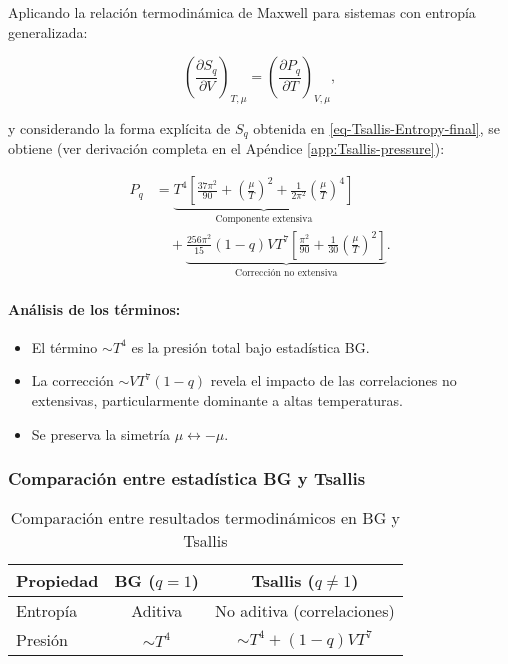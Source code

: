 Aplicando la relación termodinámica de Maxwell para sistemas con entropía generalizada:

\begin{equation}\label{eq-Maxwell-Tsallis}
\left( \frac{\partial S_q}{\partial V} \right)_{T, \mu} = \left( \frac{\partial P_q}{\partial T} \right)_{V, \mu},
\end{equation}

y considerando la forma explícita de \( S_q \) obtenida en \eqref{eq-Tsallis-Entropy-final}, se obtiene (ver derivación completa en el Apéndice \ref{app:Tsallis-pressure}):

\begin{equation}\label{eq-Pq-final}
\begin{split}
P_q &= \underbrace{T^4 \left[ \frac{37 \pi^2}{90} + \left( \frac{\mu}{T} \right)^2 + \frac{1}{2 \pi^2} \left( \frac{\mu}{T} \right)^4 \right]}_{\text{Componente extensiva}} \\
&\quad + \underbrace{\frac{256 \pi^2}{15} (1 - q) V T^7 \left[ \frac{\pi^2}{90} + \frac{1}{30} \left( \frac{\mu}{T} \right)^2 \right]}_{\text{Corrección no extensiva}}.
\end{split}
\end{equation}

\paragraph{Análisis de los términos:}
\begin{itemize}
    \item El término \( \sim T^4 \) es la presión total bajo estadística BG.
    \item La corrección \( \sim V T^7 (1-q) \) revela el impacto de las correlaciones no extensivas, particularmente dominante a altas temperaturas.
    \item Se preserva la simetría \( \mu \leftrightarrow -\mu \).
\end{itemize}

\subsubsection*{Comparación entre estadística BG y Tsallis}

\begin{table}[h]
    \centering
    \caption{Comparación entre resultados termodinámicos en BG y Tsallis}
    \begin{tabular}{lcc}
        \toprule
        \textbf{Propiedad} & \textbf{BG (\( q = 1 \))} & \textbf{Tsallis (\( q \neq 1 \))} \\
        \midrule
        Entropía & Aditiva & No aditiva (correlaciones) \\
        Presión & \( \sim T^4 \) & \( \sim T^4 + (1 - q) V T^7 \) \\
        \bottomrule
    \end{tabular}
    \label{tab:BG-vs-Tsallis}
\end{table}


